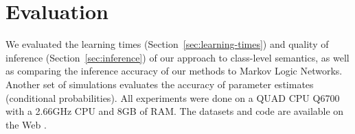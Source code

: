 \documentclass[oribibl]{llncs}
\begin{document}
%


\section{Evaluation} \label{sec:eval}

%
We evaluated the learning times (Section~\ref{sec:learning-times}) and quality of inference (Section~\ref{sec:inference}) of our approach to class-level semantics, as well as comparing the inference accuracy of our methods to Markov Logic Networks.  Another set of simulations evaluates the accuracy of parameter estimates (conditional probabilities). 
All experiments were done on a QUAD CPU Q6700 with a 2.66GHz CPU and 8GB of RAM. The datasets and code are available on the Web \cite{bib:jbnsite}.
\end{document}
